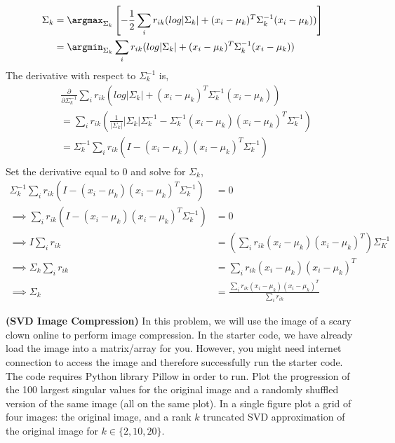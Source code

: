 \documentclass[12pt,letterpaper,boxed]{hmcpset}
\begin{document}
\begin{solution}
\begin{align*}
    \Sigma_k &= \argmax_{\Sigma_k} \left[ -\frac{1}{2} \sum_i r_{ik} (log |\Sigma_k| + (x_i - \mu_k)^T \Sigma_k^{-1}(x_i - \mu_k))  \right] \\
    &= \argmin_{\Sigma_k} \sum_i r_{ik} (log |\Sigma_k| + (x_i - \mu_k)^T \Sigma_k^{-1}(x_i - \mu_k))
  \end{align*}
  The derivative with respect to $\Sigma_k^{-1}$ is,
  \begin{align*}
    &\frac{\partial}{\partial \Sigma_k^{-1}} \sum_i r_{ik} (log |\Sigma_k| + (x_i - \mu_k)^T \Sigma_k^{-1}(x_i - \mu_k)) \\
    &= \sum_i r_{ik} (\frac{1}{|\Sigma_k|} |\Sigma_k| \Sigma_k^{-1} - \Sigma_k^{-1}(x_i - \mu_k) (x_i -\mu_k)^T \Sigma_k^{-1}) \\
    &= \Sigma_k^{-1} \sum_i r_{ik} (I - (x_i - \mu_k) (x_i -\mu_k)^T \Sigma_k^{-1}) \\
  \end{align*}
  Set the derivative equal to 0 and solve for $\Sigma_k$,
  \begin{align*}
    \Sigma_k^{-1} \sum_i r_{ik} (I - (x_i - \mu_k) (x_i -\mu_k)^T \Sigma_k^{-1}) &= 0 \\
    \implies \sum_i r_{ik} (I - (x_i - \mu_k) (x_i -\mu_k)^T \Sigma_k^{-1}) &= 0 \\
    \implies I \sum_i r_{ik} &= \left( \sum_i r_{ik} (x_i - \mu_k) (x_i -\mu_k)^T \right) \Sigma_K^{-1} \\
    \implies \Sigma_k \sum_i r_{ik} &= \sum_i r_{ik} (x_i - \mu_k) (x_i -\mu_k)^T \\
    \implies \Sigma_k &= \frac{\sum_i r_{ik} (x_i - \mu_k) (x_i -\mu_k)^T}{\sum_i r_{ik}}
  \end{align*}
\end{solution}
\newpage



\begin{problem}[2]
\textbf{(SVD Image Compression)}
In this problem, we will use the image of a scary clown online to perform image compression.  In the starter code, we have already load the image into a matrix/array for you. However, you might need internet connection to access the image and therefore successfully run the starter code. The code requires Python library Pillow in order to run.
\newline
\newline 
Plot the progression of the 100 largest singular values for the original image
and a randomly shuffled version of the same image (all on the same plot). In a single figure plot
a grid of four images: the original image, and a rank $k$ truncated SVD approximation of the original
image for $k\in\{2,10,20\}$.

\end{problem}
\begin{solution}

\end{solution}
\newpage
\end{document}
